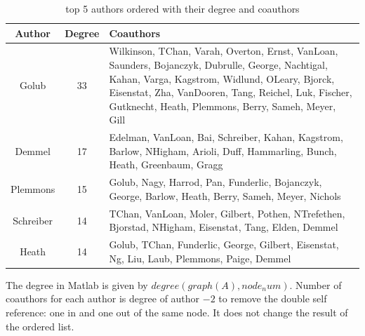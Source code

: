 \documentclass[unicode,11pt,a4paper,oneside,numbers=endperiod,openany]{scrartcl}
\begin{document}
\begin{table}[H]
    \centering
    \begin{tabular}{||c c p{5in}||}
        \hline
        Author    & Degree & Coauthors                                                                                                                                                                                                                                                          \\ [0.5ex]
        \hline\hline
        Golub     & 33     & Wilkinson, TChan, Varah, Overton, Ernst, VanLoan, Saunders, Bojanczyk, Dubrulle, George, Nachtigal, Kahan, Varga, Kagstrom, Widlund, OLeary, Bjorck, Eisenstat, Zha, VanDooren, Tang, Reichel, Luk, Fischer, Gutknecht, Heath, Plemmons, Berry, Sameh, Meyer, Gill \\ \hline
        Demmel    & 17     & Edelman, VanLoan, Bai, Schreiber, Kahan, Kagstrom, Barlow, NHigham, Arioli, Duff, Hammarling, Bunch, Heath, Greenbaum, Gragg                                                                                                                                       \\ \hline
        Plemmons  & 15     & Golub, Nagy, Harrod, Pan, Funderlic, Bojanczyk, George, Barlow, Heath, Berry, Sameh, Meyer, Nichols                                                                                                                                                                \\ \hline
        Schreiber & 14     & TChan, VanLoan, Moler, Gilbert, Pothen, NTrefethen, Bjorstad, NHigham, Eisenstat, Tang, Elden, Demmel                                                                                                                                                              \\ \hline
        Heath     & 14     & Golub, TChan, Funderlic, George, Gilbert, Eisenstat, Ng, Liu, Laub, Plemmons, Paige, Demmel                                                                                                                                                                        \\ [1ex]
        \hline
    \end{tabular}
    \caption{top 5 authors ordered with their degree and coauthors}
    \label{table:ex7_top5authors}
\end{table}

The degree in Matlab is given by $degree(graph(A), node_num)$.
Number of coauthors for each author is degree of author $-2$ to remove the double self reference: one in and one out of the same node.
It does not change the result of the ordered list.\\
\end{document}
